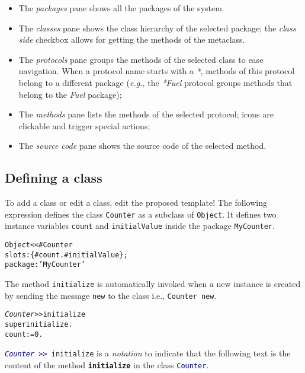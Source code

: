 \documentclass[notumble]{leaflet}
\makeatletter
\newcommand{\eg}{\emph{e.g.,}\xspace}
\newenvironment{displaycode}{%
     \par
     \hspace{1.5em}\begin{minipage}{\linewidth}
       \begin{alltt}\small}{
       \end{alltt}
     \end{minipage}
     \par}
\newcommand{\code}[1]{\foreignlanguage{english}{\texttt{#1}}}
\makeatother
\begin{document}
\begin{itemize}
\item The \emph{packages} pane shows all the packages of the system.
\item The \emph{classes} pane shows the class hierarchy of the
  selected package; the \emph{class side} checkbox allows for getting
  the methods of the metaclass.
\item The \emph{protocols} pane groups the methods of the selected
  class to ease navigation.  When a protocol name starts with a \emph{*}, methods of this
  protocol belong to a different package (\eg the \emph{*Fuel}
  protocol groups methods that belong to the \emph{Fuel} package);
\item The \emph{methods} pane lists the methods of the selected
  protocol; icons are clickable and trigger special actions;
\item The \emph{source code} pane shows the source code of the
  selected method. 
\end{itemize}

\vspace{-0.3cm}
\subsection{Defining a class}
To add a class or edit a class, edit the proposed template!
The following expression defines the class \code{Counter} as a subclass of \code{Object}.
It defines two instance variables \code{count} and \code{initialValue} inside the package \code{MyCounter}.

\begin{displaycode}
Object << #Counter
   slots: \{ #count . #initialValue \};
   package: 'MyCounter'
\end{displaycode}

The method \code{initialize} is automatically invoked when a new instance is created by sending the message \code{new} to the class i.e., \code{Counter new}.   

\begin{displaycode}
\textit{Counter >>} initialize 
    super initialize.
    count := 0. 
\end{displaycode}

\code{\textcolor{darkBlue}{\textit{Counter}\,>{}>\,}initialize} is a \textit{notation} to indicate that the following text is the content of the method \code{\textbf{initialize}} in the class \code{\textcolor{darkBlue}{Counter}}.

\vspace{-0.3cm}
\end{document}
